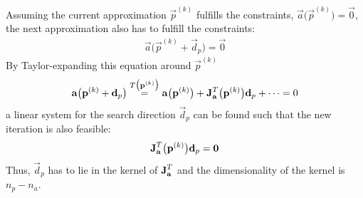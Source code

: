 				Assuming the current approximation \( \vec{p}^{(k)} \) fulfills the constraints, \( \vec{a}\big(\vec{p}^{(k)}\big) = \vec{0} \), the next approximation also has to fulfill the constraints:
				\begin{align*}
					\vec{a}\big(\vec{p}^{(k)} + \vec{d}_p\big) = \vec{0}
				\end{align*}
				By Taylor-expanding this equation around \( \vec{p}^{(k)} \)
				\begin{align*}
					\boldsymbol{\mathrm{a}}\big(\boldsymbol{\mathrm{p}}^{(k)} + \boldsymbol{\mathrm{d}}_p\big) \overset{T\big(\boldsymbol{\mathrm{p}}^{(k)}\big)}{=} \boldsymbol{\mathrm{a}}\big(\boldsymbol{\mathrm{p}}^{(k)}\big) + \boldsymbol{\mathrm{J}}_{\boldsymbol{\mathrm{a}}}^T\big(\boldsymbol{\mathrm{p}}^{(k)}\big) \boldsymbol{\mathrm{d}}_p + \cdots = 0
				\end{align*}
				a linear system for the search direction \( \vec{d}_p \) can be found such that the new iteration is also feasible:
				\begin{align*}
					\boldsymbol{\mathrm{J}}_{\boldsymbol{\mathrm{a}}}^T\big(\boldsymbol{\mathrm{p}}^{(k)}\big) \boldsymbol{\mathrm{d}}_p = \boldsymbol{\mathrm{0}}
				\end{align*}
				Thus, \( \vec{d}_p \) has to lie in the kernel of \( \boldsymbol{\mathrm{J}}_{\boldsymbol{\mathrm{a}}}^T \) and the dimensionality of the kernel is \( n_p - n_a \).
				
